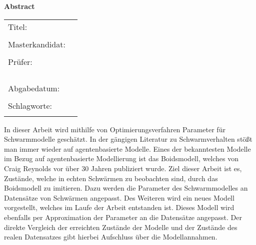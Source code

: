 \thispagestyle{plain}
\cleardoublepage
{}
{}
\vspace*{11pt}
\begin{center}
	{\LARGE \textbf{\textsf{Abstract}}}
\end{center}

\bigskip
\begin{center}
	\begin{tabular}{p{3.2cm}p{9.6cm}}
		Titel: & \thema \\
		 & \\
		Masterkandidat: & \autor \\
		 & \\
		Prüfer: & \firmaA \\ & \firmaB \\[1.1ex] & \prueferA  \\[.5ex]
		 &  \prueferB \\
		 & \\
		Abgabedatum: & \abgabedatum \\
		 & \\
		Schlagworte: & \schlagworte \\
		 & \\
	\end{tabular}
\end{center}

\bigskip

\noindent

In dieser Arbeit wird mithilfe von Optimierungsverfahren Parameter für Schwarmmodelle geschätzt.
In der gängigen Literatur zu Schwarmverhalten stößt man immer wieder auf agentenbasierte Modelle.
Eines der bekanntesten Modelle im Bezug auf agentenbasierte Modellierung ist das Boidsmodell, welches von Craig Reynolds vor über 30 Jahren publiziert wurde. Ziel dieser Arbeit ist es, Zustände, welche in echten Schwärmen zu beobachten sind, durch das Boidsmodell zu imitieren. Dazu werden die Parameter des Schwarmmodelles an Datensätze von Schwärmen angepasst. Des Weiteren wird ein neues Modell vorgestellt, welches im Laufe der Arbeit entstanden ist. Dieses Modell wird ebenfalls per Approximation der Parameter an die Datensätze angepasst. Der direkte Vergleich der erreichten Zustände der Modelle und der Zustände des realen Datensatzes gibt hierbei Aufschluss über die Modellannahmen.